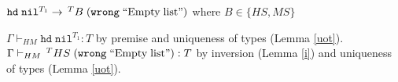 \begin{case}
$\mathtt{hd}\;\mathtt{nil}^{T_{1}}\rightarrow\,^{T}B\;(\mathtt{wrong}\;\mathrm{``Empty\;list"})$ where $B\in\lbrace HS,MS\rbrace$

$\Gamma\vdash_{HM}\mathtt{hd}\;\mathtt{nil}^{T_{1}}:T$ by premise and uniqueness of types (Lemma \ref{uot}).  $\Gamma\vdash_{HM}\,^{T}HS\;(\mathtt{wrong}\;\mathrm{``Empty\;list"}):T$ by inversion (Lemma \ref{i}) and uniqueness of types (Lemma \ref{uot}).
\end{case}